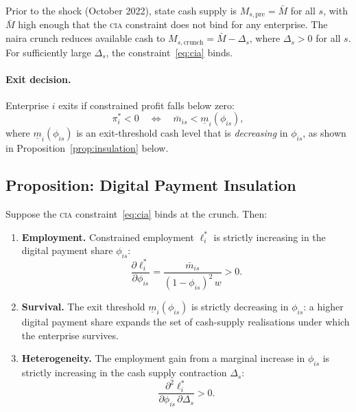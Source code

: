 Prior to the shock (October 2022), state cash supply is $M_{s,\text{pre}} = \bar{M}$
for all $s$, with $\bar{M}$ high enough that the \textsc{cia} constraint does not
bind for any enterprise. The naira crunch reduces available cash to
$M_{s,\text{crunch}} = \bar{M} - \Delta_s$, where $\Delta_s > 0$ for all $s$.
For sufficiently large $\Delta_s$, the constraint~\eqref{eq:cia} binds.

\paragraph{Exit decision.}
Enterprise $i$ exits if constrained profit falls below zero:
\begin{equation}
  \pi_i^{*} < 0
  \quad\Longleftrightarrow\quad
  \bar{m}_{is} < \underline{m}_i(\phi_{is}),
  \label{eq:exit}
\end{equation}
where $\underline{m}_i(\phi_{is})$ is an exit-threshold cash level that is
\emph{decreasing} in $\phi_{is}$, as shown in Proposition~\ref{prop:insulation}
below.

\subsection{Proposition: Digital Payment Insulation}

\begin{proposition}
\label{prop:insulation}
Suppose the \textsc{cia} constraint~\eqref{eq:cia} binds at the crunch. Then:
\begin{enumerate}[label=(\roman*)]
  \item \textbf{Employment.} Constrained employment $\ell_i^{*}$ is strictly
    increasing in the digital payment share $\phi_{is}$:
    \[
      \frac{\partial \ell_i^{*}}{\partial \phi_{is}}
        = \frac{\bar{m}_{is}}{(1-\phi_{is})^2\,w} > 0.
    \]
  \item \textbf{Survival.} The exit threshold $\underline{m}_i(\phi_{is})$
    is strictly decreasing in $\phi_{is}$: a higher digital payment share
    expands the set of cash-supply realisations under which the enterprise
    survives.
  \item \textbf{Heterogeneity.} The employment gain from a marginal increase in
    $\phi_{is}$ is strictly increasing in the cash supply contraction
    $\Delta_s$:
    \[
      \frac{\partial^2 \ell_i^{*}}{\partial \phi_{is}\,\partial \Delta_s} > 0.
    \]
\end{enumerate}
\end{proposition}

